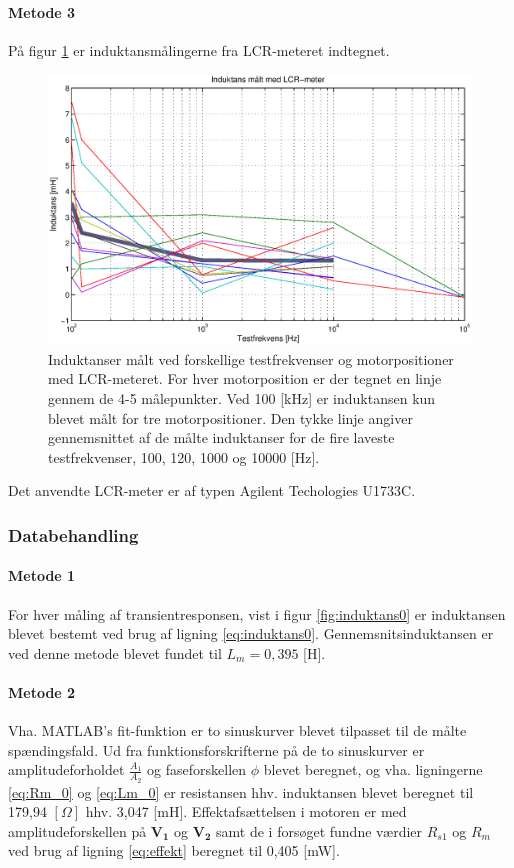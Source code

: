 \paragraph{Metode 3\\}
På figur \ref{fig:induktans2} er induktansmålingerne fra LCR-meteret indtegnet.
\begin{figure}[th!]
	\centering
	\includegraphics[width=1\textwidth]{./graphics/induktans2.eps}
	\caption[Induktans målt med LCR-meter]
		{Induktanser målt ved forskellige testfrekvenser og motorpositioner med LCR-meteret.
		For hver motorposition er der tegnet en linje gennem de 4-5 målepunkter.
		Ved 100 [kHz] er induktansen kun blevet målt for tre motorpositioner.
		Den tykke linje angiver gennemsnittet af de målte induktanser for de fire laveste testfrekvenser,
		100, 120, 1000 og 10000 [Hz].}
	\label{fig:induktans2}
\end{figure}

Det anvendte LCR-meter er af typen Agilent Techologies U1733C.

\subsubsection{Databehandling}
\paragraph{Metode 1\\}
For hver måling af transientresponsen, vist i figur \ref{fig:induktans0} er induktansen blevet
bestemt ved brug af ligning \ref{eq:induktans0}.
Gennemsnitsinduktansen er ved denne metode blevet fundet til \(L_m=0,395\) [H].

\paragraph{Metode 2\\}
Vha. MATLAB's fit-funktion er to sinuskurver blevet tilpasset til de målte spændingsfald.
Ud fra funktionsforskrifterne på de to sinuskurver er amplitudeforholdet \(\frac{A_1}{A_2}\)
og faseforskellen \(\phi\) blevet beregnet,
og vha. ligningerne \ref{eq:Rm_0} og \ref{eq:Lm_0} er resistansen hhv. induktansen blevet beregnet til
179,94 \([\Omega]\) hhv. 3,047 [mH].
Effektafsættelsen i motoren er med amplitudeforskellen på \(\mathbf{V_1}\) og \(\mathbf{V_2}\) samt
de i forsøget fundne værdier \(R_{s1}\) og \(R_m\) ved brug af ligning \ref{eq:effekt} beregnet til 0,405 [mW].

